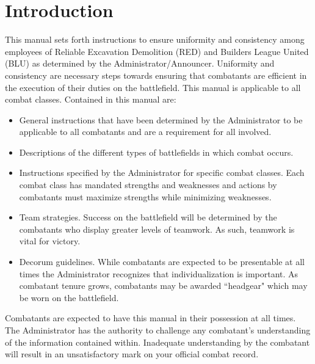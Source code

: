 \section{Introduction}
\label{Introduction}
This manual sets forth instructions to ensure uniformity and consistency among employees of Reliable Excavation Demolition (RED) and Builders League United (BLU) as determined by the Administrator/Announcer.  Uniformity and consistency are necessary steps towards ensuring that combatants are efficient in the execution of their duties on the battlefield. This manual is applicable to all combat classes.  Contained in this manual are:

 \begin{itemize}

\item General instructions that have been determined by the Administrator to be applicable to all combatants and are a requirement for all involved.
\item Descriptions of the different types of battlefields in which combat occurs.  
\item Instructions specified by the Administrator for specific combat classes.  Each combat class has mandated strengths and weaknesses and actions by combatants must maximize strengths while minimizing weaknesses.  
\item Team strategies.  Success on the battlefield will be determined by the combatants who display greater levels of teamwork.  As such, teamwork is vital for victory. 
\item Decorum guidelines.  While combatants are expected to be presentable at all times the Administrator recognizes that individualization is important. As combatant tenure grows, combatants may be awarded ``headgear" which may be worn on the battlefield.
\end{itemize}
Combatants are expected to have this manual in their possession at all times. The Administrator has the authority to challenge any combatant's understanding of the information contained within. Inadequate understanding by the combatant will result in an unsatisfactory mark on your official combat record.
